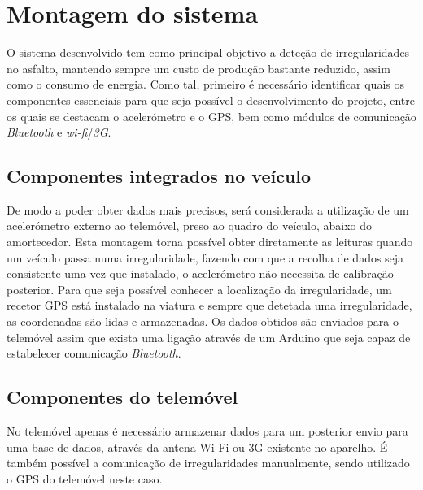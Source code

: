 \section{Montagem do sistema}
\label{sec:montagem_do_sistema}

O sistema desenvolvido tem como principal objetivo a deteção de irregularidades no asfalto, mantendo sempre um custo de produção bastante reduzido, assim como o consumo de energia. Como tal, primeiro é necessário identificar quais os componentes essenciais para que seja possível o desenvolvimento do projeto, entre os quais se destacam o acelerómetro e o GPS, bem como módulos de comunicação \emph{Bluetooth} e \emph{wi-fi}/\emph{3G}.

\subsection{Componentes integrados no veículo}
\label{subsec: componentes_montados_no_veiculo}

De modo a poder obter dados mais precisos, será considerada a utilização de um acelerómetro externo ao telemóvel, preso ao quadro do veículo, abaixo do amortecedor.
Esta montagem torna possível obter diretamente as leituras quando um veículo passa numa irregularidade, fazendo com que a recolha de dados seja consistente uma vez que instalado, o acelerómetro não necessita de calibração posterior.
Para que seja possível conhecer a localização da irregularidade, um recetor GPS está instalado na viatura e sempre que detetada uma irregularidade, as coordenadas são lidas e armazenadas.
Os dados obtidos são enviados para o telemóvel assim que exista uma ligação através de um Arduino que seja capaz de estabelecer comunicação \emph{Bluetooth}.

\subsection{Componentes do telemóvel}
\label{subsec: componentes_do_telemovel}

No telemóvel apenas é necessário armazenar dados para um posterior envio para uma base de dados, através da antena Wi-Fi ou 3G existente no aparelho.
É também possível a comunicação de irregularidades manualmente, sendo utilizado o GPS do telemóvel neste caso.